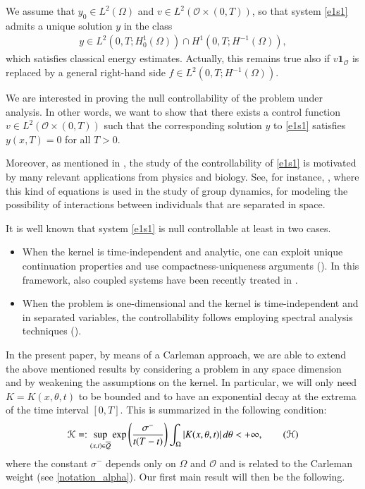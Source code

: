 \documentclass[preprint,1p]{elsarticle}
\begin{document}
We assume that $y_0\in L^2(\Omega)$ and $v\in L^2(\mathcal O\times(0,T))$, so that system \eqref{e1s1} admits a unique solution $y$ in the class
\begin{align}\label{y_reg}
	y\in L^2(0,T;H^{1}_{0}(\Omega))\cap H^1(0,T;H^{-1}(\Omega)),
\end{align}
which satisfies classical energy estimates. Actually, this remains true also if $v\mathbf{1}_{\mathcal O}$ is replaced by a general right-hand side $f\in L^2(0,T;H^{-1}(\Omega))$.

We are interested in proving the null controllability of the problem under analysis. In other words, we want to show that there exists a control function $v\in L^2(\mathcal O\times(0,T))$ such that the corresponding solution $y$ to \eqref{e1s1} satisfies $y(x,T)=0$ for all $T>0$.

Moreover, as mentioned in \cite{fernandez2016null}, the study of the controllability of \eqref{e1s1} is motivated by many relevant applications from physics and biology. See, for instance, \cite[Section 7.9.2]{okubo2013diffusion}, where this kind of equations is used in the study of group dynamics, for modeling the possibility of interactions between individuals that are separated in space. 

It is well known that system \eqref{e1s1} is null controllable at least in two cases.
\begin{itemize}
	\item When the kernel is time-independent and analytic, one can exploit unique continuation properties and use compactness-uniqueness arguments (\cite{fernandez2016null}). In this framework, also coupled systems have been recently treated in \cite{lissy2018internal}.
	\item When the problem is one-dimensional and the kernel is time-independent and in separated variables, the controllability follows employing spectral analysis techniques (\cite{micu2018local}).
\end{itemize}

In the present paper, by means of a Carleman approach, we are able to extend the above mentioned results by considering a problem in any space dimension and by weakening the assumptions on the kernel. In particular, we will only need ${K=K(x,\theta,t)}$ to be bounded and to have an exponential decay at the extrema of the time interval $[0,T]$. This is summarized in the following condition:
\begin{align}\label{K_est_gen}
	\mathcal{K}=:\sup_{(x,t)\in\overline{Q}} \exp\left(\frac{\sigma^-}{t(T-t)}\right)\int_{\Omega} |K(x,\theta,t)|\,d\theta < +\infty, \tag{$\mathcal{H}$}
\end{align}
where the constant $\sigma^-$ depends only on $\Omega$ and $\mathcal{O}$ and is related to the Carleman weight (see \eqref{notation_alpha}). Our first main result will then be the following.
\end{document}

